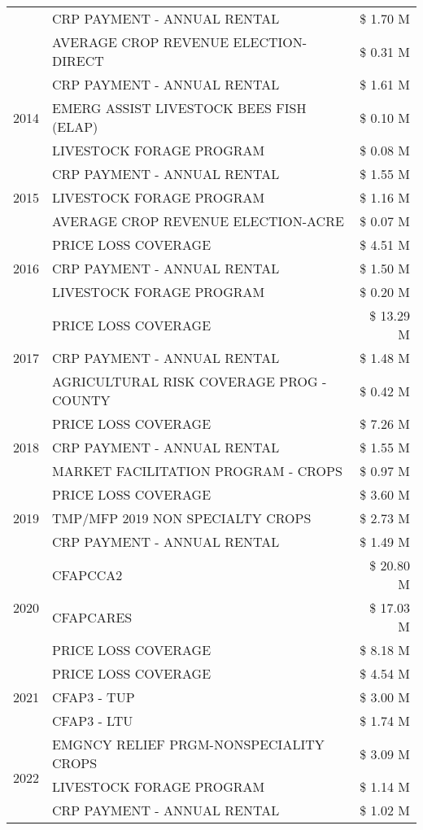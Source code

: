 \begin{tabular}{llr}
 & CRP PAYMENT - ANNUAL RENTAL & \$ 1.70 M \\
 & AVERAGE CROP REVENUE ELECTION-DIRECT & \$ 0.31 M \\
\cline{1-3}
\multirow[t]{3}{*}{2014} & CRP PAYMENT - ANNUAL RENTAL & \$ 1.61 M \\
 & EMERG ASSIST LIVESTOCK BEES FISH (ELAP) & \$ 0.10 M \\
 & LIVESTOCK FORAGE PROGRAM & \$ 0.08 M \\
\cline{1-3}
\multirow[t]{3}{*}{2015} & CRP PAYMENT - ANNUAL RENTAL & \$ 1.55 M \\
 & LIVESTOCK FORAGE PROGRAM & \$ 1.16 M \\
 & AVERAGE CROP REVENUE ELECTION-ACRE & \$ 0.07 M \\
\cline{1-3}
\multirow[t]{3}{*}{2016} & PRICE LOSS COVERAGE & \$ 4.51 M \\
 & CRP PAYMENT - ANNUAL RENTAL & \$ 1.50 M \\
 & LIVESTOCK FORAGE PROGRAM & \$ 0.20 M \\
\cline{1-3}
\multirow[t]{3}{*}{2017} & PRICE LOSS COVERAGE & \$ 13.29 M \\
 & CRP PAYMENT - ANNUAL RENTAL & \$ 1.48 M \\
 & AGRICULTURAL RISK COVERAGE PROG - COUNTY & \$ 0.42 M \\
\cline{1-3}
\multirow[t]{3}{*}{2018} & PRICE LOSS COVERAGE & \$ 7.26 M \\
 & CRP PAYMENT - ANNUAL RENTAL & \$ 1.55 M \\
 & MARKET FACILITATION PROGRAM - CROPS & \$ 0.97 M \\
\cline{1-3}
\multirow[t]{3}{*}{2019} & PRICE LOSS COVERAGE & \$ 3.60 M \\
 & TMP/MFP 2019 NON SPECIALTY CROPS & \$ 2.73 M \\
 & CRP PAYMENT - ANNUAL RENTAL & \$ 1.49 M \\
\cline{1-3}
\multirow[t]{3}{*}{2020} & CFAPCCA2 & \$ 20.80 M \\
 & CFAPCARES & \$ 17.03 M \\
 & PRICE LOSS COVERAGE & \$ 8.18 M \\
\cline{1-3}
\multirow[t]{3}{*}{2021} & PRICE LOSS COVERAGE & \$ 4.54 M \\
 & CFAP3 - TUP & \$ 3.00 M \\
 & CFAP3 - LTU & \$ 1.74 M \\
\cline{1-3}
\multirow[t]{3}{*}{2022} & EMGNCY RELIEF PRGM-NONSPECIALITY CROPS & \$ 3.09 M \\
 & LIVESTOCK FORAGE PROGRAM & \$ 1.14 M \\
 & CRP PAYMENT - ANNUAL RENTAL & \$ 1.02 M \\
\cline{1-3}
\bottomrule
\end{tabular}
